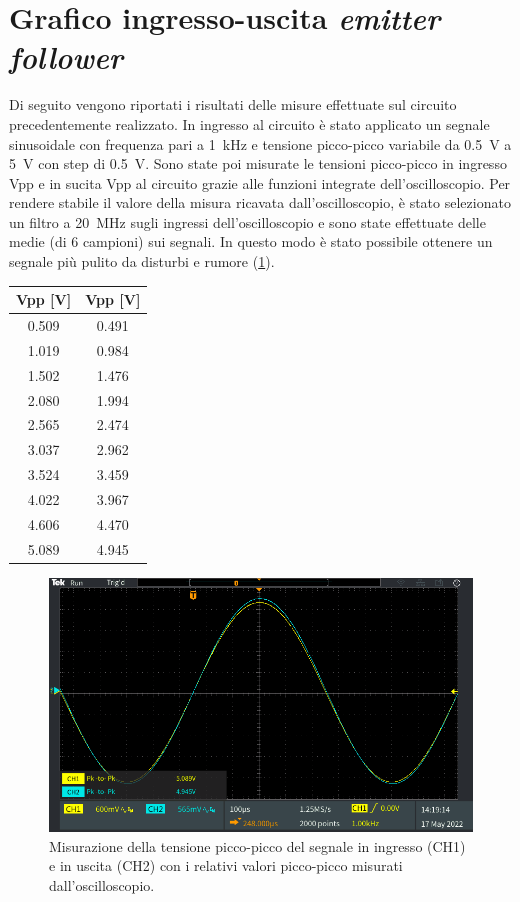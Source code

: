 \section{Grafico ingresso-uscita \textit{emitter follower}}
Di seguito vengono riportati i risultati delle misure effettuate sul circuito precedentemente realizzato. In ingresso al circuito è stato applicato un segnale sinusoidale con frequenza pari a \SI{1}{\kilo\hertz} e tensione picco-picco variabile da \SI{0.5}{\volt} a \SI{5}{\volt} con step di \SI{0.5}{\volt}. Sono state poi misurate le tensioni picco-picco in ingresso Vpp e in sucita Vpp al circuito grazie alle funzioni integrate dell'oscilloscopio. Per rendere stabile il valore della misura ricavata dall'oscilloscopio, è stato selezionato un filtro a \SI{20}{\mega\hertz} sugli ingressi dell'oscilloscopio e sono state effettuate delle medie (di 6
 campioni) sui segnali. In questo modo è stato possibile ottenere un segnale più pulito da disturbi e rumore (\Fig\ref{fig:emitterfollwer_misurepiccopicco}).
\begin{table}[h!]
	\centering
	\begin{tabular}{c|c}
		\hline
		Vpp\sub{i} [V] & Vpp\sub{o} [V]\\ \hline
		0.509 & 0.491 \\ \hline
		1.019 & 0.984 \\ \hline
		1.502 & 1.476 \\ \hline
		2.080 & 1.994 \\ \hline
		2.565 & 2.474 \\ \hline
		3.037 & 2.962 \\ \hline
		3.524 & 3.459 \\ \hline
		4.022 & 3.967 \\ \hline
		4.606 & 4.470 \\ \hline
		5.089 & 4.945 \\ \hline
	\end{tabular}
\end{table}
\begin{figure}[h!]
	\centering
	\includegraphics[width=0.7\linewidth]{./ImageFiles/Laboratorio 2/TEK00012}
	\caption{Misurazione della tensione picco-picco del segnale in ingresso (CH1) e in uscita (CH2) con i relativi valori picco-picco misurati dall'oscilloscopio.}
	\label{fig:emitterfollwer_misurepiccopicco}
\end{figure}
